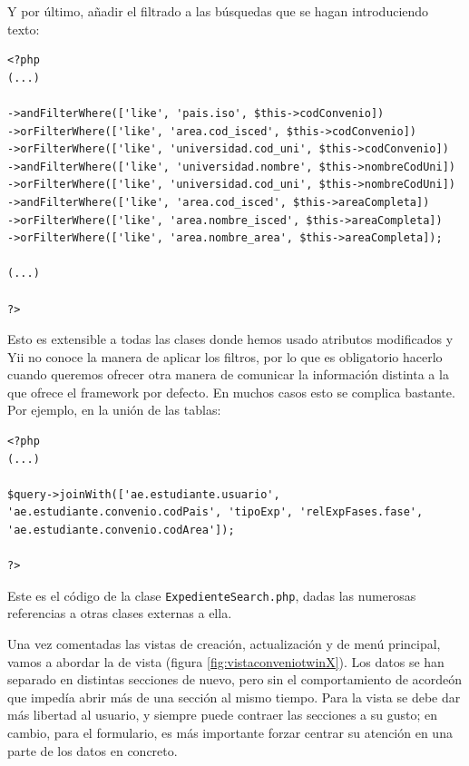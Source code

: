 Y por último, añadir el filtrado a las búsquedas que se hagan introduciendo texto:

\begin{verbatim}
<?php
(...)

->andFilterWhere(['like', 'pais.iso', $this->codConvenio])
->orFilterWhere(['like', 'area.cod_isced', $this->codConvenio])
->orFilterWhere(['like', 'universidad.cod_uni', $this->codConvenio])
->andFilterWhere(['like', 'universidad.nombre', $this->nombreCodUni])
->orFilterWhere(['like', 'universidad.cod_uni', $this->nombreCodUni])
->andFilterWhere(['like', 'area.cod_isced', $this->areaCompleta])
->orFilterWhere(['like', 'area.nombre_isced', $this->areaCompleta])
->orFilterWhere(['like', 'area.nombre_area', $this->areaCompleta]);

(...)

?>
\end{verbatim}

Esto es extensible a todas las clases donde hemos usado atributos modificados y Yii no conoce la manera de aplicar los filtros, por lo que es obligatorio hacerlo cuando queremos ofrecer otra manera de comunicar la información distinta a la que ofrece el framework por defecto. En muchos casos esto se complica bastante. Por ejemplo, en la unión de las tablas:

\begin{verbatim}
<?php
(...)

$query->joinWith(['ae.estudiante.usuario', 'ae.estudiante.convenio.codPais', 'tipoExp', 'relExpFases.fase', 'ae.estudiante.convenio.codArea']);

?>
\end{verbatim}

Este es el código de la clase \texttt{ExpedienteSearch.php}, dadas las numerosas referencias a otras clases externas a ella.

Una vez comentadas las vistas de creación, actualización y de menú principal, vamos a abordar la de vista (figura \ref{fig:vistaconveniotwinX}). Los datos se han separado en distintas secciones de nuevo, pero sin el comportamiento de acordeón que impedía abrir más de una sección al mismo tiempo. Para la vista se debe dar más libertad al usuario, y siempre puede contraer las secciones a su gusto; en cambio, para el formulario, es más importante forzar centrar su atención en una parte de los datos en concreto.

